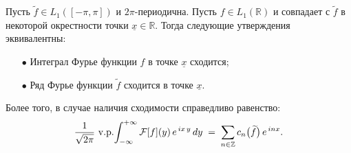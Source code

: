 \begin{theorem}
    Пусть \( \widetilde{f} \in L_1([-\pi, \pi]) \) и \(2\pi\)-периодична.
    Пусть \( f \in L_1(\mathbb{R}) \) и совпадает с \( \widetilde{f} \) в некоторой окрестности точки \( \underline{x} \in \mathbb{R} \).
    Тогда следующие утверждения эквивалентны:
    \begin{enumerate}
        \item[$\bullet$] Интеграл Фурье функции $f$ в точке \(\underline{x}\) сходится;
        \item[$\bullet$] Ряд Фурье функции \(\widetilde{f}\) сходится в точке \(\underline{x}\).
    \end{enumerate}
    Более того, в случае наличия сходимости справедливо равенство:
\[
\frac{1}{\sqrt{2\pi}}\,\mathop{\mathrm{v.p.}}\!\int
_{-\infty}^{+\infty}
\mathcal{F}[f](y)\,e^{\,i x\,y}\,dy
\;=\;
\sum_{n\in\mathbb{Z}}
c_{n}\bigl(\widetilde{f}\bigr)\,e^{\,i n x}.
\]
\end{theorem}

